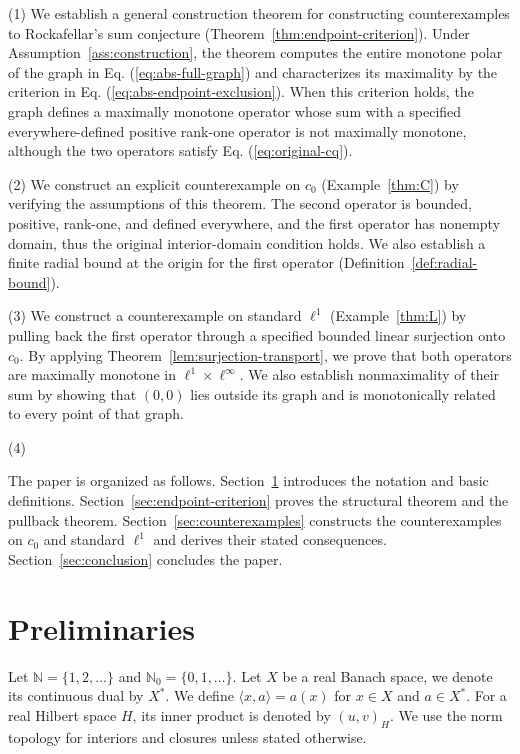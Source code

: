 \documentclass[11pt]{article}
\newcommand{\N}{\mathbb N}
\newcommand{\pair}[2]{\langle #1,#2\rangle}
\theoremstyle{definition}
\theoremstyle{remark}
\begin{document}
(1) We establish a general construction theorem for constructing counterexamples to Rockafellar's sum conjecture (Theorem~\ref{thm:endpoint-criterion}). Under Assumption~\ref{ass:construction}, the theorem computes the entire monotone polar of the graph in Eq. (\ref{eq:abs-full-graph}) and characterizes its maximality by the criterion in Eq. (\ref{eq:abs-endpoint-exclusion}). When this criterion holds, the graph defines a maximally monotone operator whose sum with a specified everywhere-defined positive rank-one operator is not maximally monotone, although the two operators satisfy Eq. (\ref{eq:original-cq}).

(2) We construct an explicit counterexample on $c_0$ (Example~\ref{thm:C}) by verifying the assumptions of this theorem. The second operator is bounded, positive, rank-one, and defined everywhere, and the first operator has nonempty domain, thus the original interior-domain condition holds. We also establish a finite radial bound at the origin for the first operator (Definition~\ref{def:radial-bound}). 

(3) We construct a counterexample on standard $\ell^1$ (Example~\ref{thm:L}) by pulling back the first operator through a specified bounded linear surjection onto $c_0$. By applying Theorem~\ref{lem:surjection-transport}, we prove that both operators are maximally monotone in $\ell^1\times\ell^\infty$. We also establish nonmaximality of their sum by showing that $(0,0)$ lies outside its graph and is monotonically related to every point of that graph.

(4) 

The paper is organized as follows. Section~\ref{sec:definitions} introduces the notation and basic definitions. Section~\ref{sec:endpoint-criterion} proves the structural theorem and the pullback theorem. Section~\ref{sec:counterexamples} constructs the counterexamples on $c_0$ and standard $\ell^1$ and derives their stated consequences. Section~\ref{sec:conclusion} concludes the paper. 


\section{Preliminaries}
\label{sec:definitions}
Let $\N=\{1,2,\ldots\}$ and $\N_0=\{0,1,\ldots\}$. Let $X$ be a real Banach space, we denote its continuous dual by $X^*$. We define $\pair{x}{a}=a(x)$ for $x\in X$ and $a\in X^*$. For a real Hilbert space $H$, its inner product is denoted by $(u,v)_H$. We use the norm topology for interiors and closures unless stated otherwise. 
\end{document}
